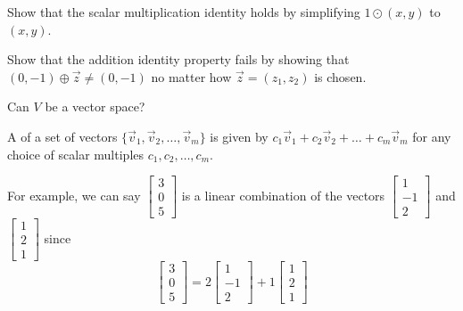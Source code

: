 \begin{applicationActivities}
\begin{activity}{15}
  \begin{subactivity}
    Show that the scalar multiplication identity holds by
    simplifying \(1\odot(x,y)\) to \((x,y)\).
  \end{subactivity}

  \begin{subactivity}
    Show that the addition identity property fails by
    showing that \((0,-1)\oplus\vec z\not=(0,-1)\) no matter how
    \(\vec z=(z_1,z_2)\) is chosen.
  \end{subactivity}

  \begin{subactivity}
    Can \(V\) be a vector space?
  \end{subactivity}
\end{activity}

\begin{definition}
  A  of a set of vectors
  \(\{\vec v_1,\vec v_2,\dots,\vec v_m\}\) is given by
  \(c_1\vec v_1+c_2\vec v_2+\dots+c_m\vec v_m\) for any choice of
  scalar multiples \(c_1,c_2,\dots,c_m\).

	\vspace{2em}

  For example, we can say \(\begin{bmatrix}3 \\0 \\ 5\end{bmatrix}\) is a linear combination of the vectors \(\begin{bmatrix} 1 \\ -1 \\ 2 \end{bmatrix}\) and \(\begin{bmatrix} 1 \\ 2 \\ 1 \end{bmatrix}\) since \[\begin{bmatrix} 3 \\ 0 \\ 5 \end{bmatrix} = 2 \begin{bmatrix} 1 \\ -1 \\ 2 \end{bmatrix} + 1\begin{bmatrix} 1 \\ 2 \\ 1 \end{bmatrix}\]
\end{definition}


\end{applicationActivities}
